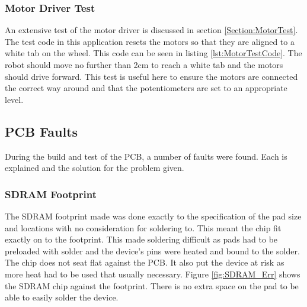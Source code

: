 \subsubsection{Motor Driver Test}
An extensive test of the motor driver is discussed in section \ref{Section:MotorTest}. The test code in this application resets the motors so that they are aligned to a white tab on the wheel. This code can be seen in listing \ref{lst:MotorTestCode}. The robot should move no further than 2cm to reach a white tab and the motors should drive forward. This test is useful here to ensure the motors are connected the correct way around and that the potentiometers are set to an appropriate level.



\subsection{PCB Faults}
During the build and test of the PCB, a number of faults were found. Each is explained and the solution for the problem given. 
\subsubsection{SDRAM Footprint}
The SDRAM footprint made was done exactly to the specification of the pad size and locations with no consideration for soldering to. This meant the chip fit exactly on to the footprint. This made soldering difficult as pads had to be preloaded with solder and the device's pins were heated and bound to the solder. The chip does not seat flat against the PCB. It also put the device at risk as more heat had to be used that usually necessary. Figure \ref{fig:SDRAM_Err} shows the SDRAM chip against the footprint. There is no extra space on the pad to be able to easily solder the device.

